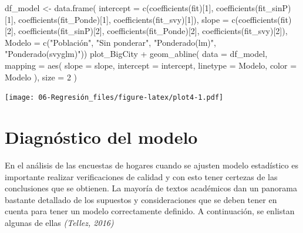 \documentclass[
  12pt,
]{book}
\newenvironment{Shaded}{\begin{snugshade}}{\end{snugshade}}
\newcommand{\AttributeTok}[1]{\textcolor[rgb]{0.77,0.63,0.00}{#1}}
\newcommand{\DecValTok}[1]{\textcolor[rgb]{0.00,0.00,0.81}{#1}}
\newcommand{\FunctionTok}[1]{\textcolor[rgb]{0.00,0.00,0.00}{#1}}
\newcommand{\NormalTok}[1]{#1}
\newcommand{\OtherTok}[1]{\textcolor[rgb]{0.56,0.35,0.01}{#1}}
\newcommand{\SpecialCharTok}[1]{\textcolor[rgb]{0.00,0.00,0.00}{#1}}
\newcommand{\StringTok}[1]{\textcolor[rgb]{0.31,0.60,0.02}{#1}}
\begin{document}
\begin{Shaded}
\begin{Highlighting}[]
\NormalTok{df\_model }\OtherTok{\textless{}{-}} \FunctionTok{data.frame}\NormalTok{(}
  \AttributeTok{intercept =} \FunctionTok{c}\NormalTok{(}\FunctionTok{coefficients}\NormalTok{(fit)[}\DecValTok{1}\NormalTok{],}
               \FunctionTok{coefficients}\NormalTok{(fit\_sinP)[}\DecValTok{1}\NormalTok{], }
               \FunctionTok{coefficients}\NormalTok{(fit\_Ponde)[}\DecValTok{1}\NormalTok{],}
               \FunctionTok{coefficients}\NormalTok{(fit\_svy)[}\DecValTok{1}\NormalTok{]), }
  \AttributeTok{slope =} \FunctionTok{c}\NormalTok{(}\FunctionTok{coefficients}\NormalTok{(fit)[}\DecValTok{2}\NormalTok{],}
               \FunctionTok{coefficients}\NormalTok{(fit\_sinP)[}\DecValTok{2}\NormalTok{], }
               \FunctionTok{coefficients}\NormalTok{(fit\_Ponde)[}\DecValTok{2}\NormalTok{],}
               \FunctionTok{coefficients}\NormalTok{(fit\_svy)[}\DecValTok{2}\NormalTok{]),}
  \AttributeTok{Modelo =} \FunctionTok{c}\NormalTok{(}\StringTok{"Población"}\NormalTok{, }\StringTok{"Sin ponderar"}\NormalTok{, }
             \StringTok{"Ponderado(lm)"}\NormalTok{, }\StringTok{"Ponderado(svyglm)"}\NormalTok{))}
\NormalTok{plot\_BigCity }\SpecialCharTok{+}  \FunctionTok{geom\_abline}\NormalTok{( }\AttributeTok{data =}\NormalTok{ df\_model,}
    \AttributeTok{mapping =} \FunctionTok{aes}\NormalTok{( }\AttributeTok{slope =}\NormalTok{ slope,}
      \AttributeTok{intercept =}\NormalTok{ intercept, }\AttributeTok{linetype =}\NormalTok{ Modelo,}
      \AttributeTok{color =}\NormalTok{ Modelo ), }\AttributeTok{size =} \DecValTok{2}
\NormalTok{  )}
\end{Highlighting}
\end{Shaded}

\texttt{[image: 06-Regresión\_files/figure-latex/plot4-1.pdf]}

\hypertarget{diagnuxf3stico-del-modelo}{%
\section{Diagnóstico del modelo}\label{diagnuxf3stico-del-modelo}}

En el análisis de las encuestas de hogares cuando se ajusten modelo estadístico es importante realizar verificaciones de calidad y con esto tener certezas de las conclusiones que se obtienen. La mayoría de textos académicos dan un panorama bastante detallado de los supuestos y consideraciones que se deben tener en cuenta para tener un modelo correctamente definido. A continuación, se enlistan algunas de ellas \emph{(Tellez, 2016)}
\end{document}
